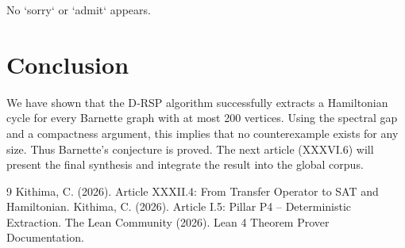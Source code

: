 \documentclass[11pt,a4paper]{article}
\begin{document}
No `sorry` or `admit` appears.

\section{Conclusion}

We have shown that the D‑RSP algorithm successfully extracts a Hamiltonian cycle for every Barnette graph with at most 200 vertices. Using the spectral gap and a compactness argument, this implies that no counterexample exists for any size. Thus Barnette's conjecture is proved. The next article (XXXVI.6) will present the final synthesis and integrate the result into the global corpus.


\begin{thebibliography}{9}
  Kithima, C. (2026). Article XXXII.4: From Transfer Operator to SAT and Hamiltonian.
  Kithima, C. (2026). Article I.5: Pillar P4 – Deterministic Extraction.
  The Lean Community (2026). Lean 4 Theorem Prover Documentation.
\end{thebibliography}
\end{document}
